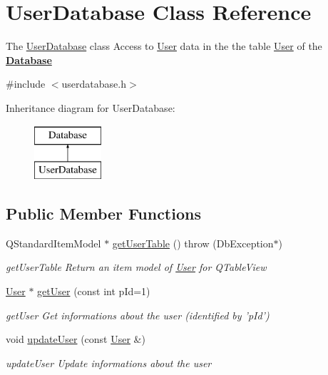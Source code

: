 \hypertarget{classUserDatabase}{\section{User\-Database Class Reference}
\label{classUserDatabase}
}


The \hyperlink{classUserDatabase}{User\-Database} class Access to \hyperlink{classUser}{User} data in the the table \hyperlink{classUser}{User} of the {\bfseries \hyperlink{classDatabase}{Database}}  




{\ttfamily \#include $<$userdatabase.\-h$>$}

Inheritance diagram for User\-Database\-:\begin{figure}[H]
\begin{center}
\leavevmode
\includegraphics[height=2.000000cm]{de/d47/classUserDatabase}
\end{center}
\end{figure}
\subsection*{Public Member Functions}
\begin{DoxyCompactItemize}
\item 
Q\-Standard\-Item\-Model $\ast$ \hyperlink{classUserDatabase_a6020d6686916f20b3e6a1a5fa5fa7978}{get\-User\-Table} ()  throw (\-Db\-Exception$\ast$)
\begin{DoxyCompactList}\small\item\em get\-User\-Table Return an item model of \hyperlink{classUser}{User} for Q\-Table\-View \end{DoxyCompactList}\item 
\hyperlink{classUser}{User} $\ast$ \hyperlink{classUserDatabase_ab95ed012ce83d09e57ad902cc304585c}{get\-User} (const int p\-Id=1)
\begin{DoxyCompactList}\small\item\em get\-User Get informations about the user (identified by 'p\-Id') \end{DoxyCompactList}\item 
\hypertarget{classUserDatabase_a5d7ecaa321c764615ed3cff211ccd84f}{void \hyperlink{classUserDatabase_a5d7ecaa321c764615ed3cff211ccd84f}{update\-User} (const \hyperlink{classUser}{User} \&)}\label{classUserDatabase_a5d7ecaa321c764615ed3cff211ccd84f}

\begin{DoxyCompactList}\small\item\em update\-User Update informations about the user \end{DoxyCompactList}\end{DoxyCompactItemize}
